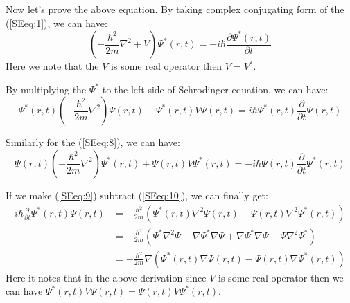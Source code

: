 Now let's prove the above equation. By taking complex conjugating
form of the (\ref{SEeq:1}), we can have:
\begin{equation}\label{SEeq:8}
\left(-\frac{\hbar^{2}}{2m}\nabla^{2} + V \right)\Psi^{*}(r,t) = -i
\hbar \frac{\partial \Psi^{*}(r,t)}{\partial t}
\end{equation}
Here we note that the $V$ is some real operator then $V = V^{*}$.

By multiplying the $\Psi^{*}$ to the left side of Schrodinger
equation, we can have:
\begin{equation}\label{SEeq:9}
\Psi^{*}(r,t)\left(-\frac{\hbar^{2}}{2m}\nabla^{2}\right)\Psi(r,t) +
\Psi^{*}(r,t) V \Psi(r,t) = i \hbar
\Psi^{*}(r,t)\frac{\partial}{\partial t}\Psi(r,t)
\end{equation}

Similarly for the (\ref{SEeq:8}), we can have:
\begin{equation}\label{SEeq:10}
\Psi(r,t)\left(-\frac{\hbar^{2}}{2m}\nabla^{2}\right)\Psi^{*}(r,t) +
\Psi(r,t) V \Psi^{*}(r,t) = -i \hbar
\Psi(r,t)\frac{\partial}{\partial t}\Psi^{*}(r,t)
\end{equation}

If we make (\ref{SEeq:9}) subtract (\ref{SEeq:10}), we can finally
get:
\begin{align}\label{SEeq:11}
i \hbar\frac{\partial}{\partial t}\Psi^{*}(r,t)\Psi(r,t) &=
-\frac{\hbar^{2}}{2m}\left(\Psi^{*}(r,t)\nabla^{2}\Psi(r,t)
-\Psi(r,t)\nabla^{2}\Psi^{*}(r,t)\right) \nonumber \\
&=-\frac{\hbar^{2}}{2m}\left(\Psi^{*}\nabla^{2}\Psi -
\nabla\Psi^{*}\nabla\Psi + \nabla\Psi^{*}\nabla\Psi
-\Psi\nabla^{2}\Psi^{*}\right) \nonumber \\
&=-\frac{\hbar^{2}}{2m}\nabla\left(\Psi^{*}(r,t)\nabla\Psi(r,t)
-\Psi(r,t)\nabla\Psi^{*}(r,t)\right)
\end{align}
Here it notes that in the above derivation since $V$ is some real
operator then we can have $\Psi^{*}(r,t) V \Psi(r,t) = \Psi(r,t) V
\Psi^{*}(r,t)$.

